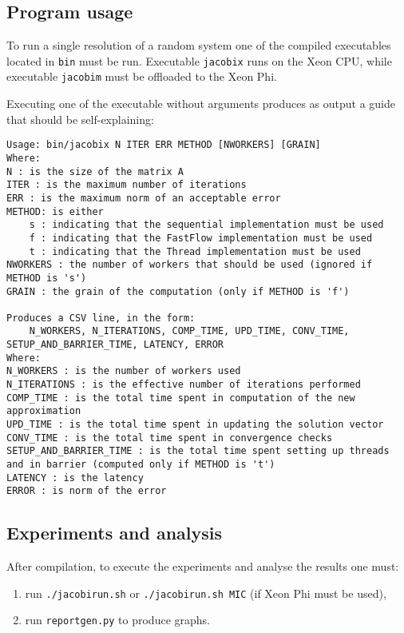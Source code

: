 \subsection{Program usage}
To run a single resolution of a random system one of the compiled executables located in \verb|bin| must be run.
Executable \verb|jacobix| runs on the Xeon CPU, while executable \verb|jacobim| must be offloaded to the Xeon Phi.

Executing one of the executable without arguments produces as output a guide that should be self-explaining:
\begin{lstlisting}
Usage: bin/jacobix N ITER ERR METHOD [NWORKERS] [GRAIN]
Where: 
N : is the size of the matrix A
ITER : is the maximum number of iterations
ERR : is the maximum norm of an acceptable error
METHOD: is either
	s : indicating that the sequential implementation must be used
	f : indicating that the FastFlow implementation must be used
	t : indicating that the Thread implementation must be used
NWORKERS : the number of workers that should be used (ignored if METHOD is 's')
GRAIN : the grain of the computation (only if METHOD is 'f')

Produces a CSV line, in the form:
	N_WORKERS, N_ITERATIONS, COMP_TIME, UPD_TIME, CONV_TIME, SETUP_AND_BARRIER_TIME, LATENCY, ERROR
Where:
N_WORKERS : is the number of workers used
N_ITERATIONS : is the effective number of iterations performed
COMP_TIME : is the total time spent in computation of the new approximation
UPD_TIME : is the total time spent in updating the solution vector
CONV_TIME : is the total time spent in convergence checks
SETUP_AND_BARRIER_TIME : is the total time spent setting up threads and in barrier (computed only if METHOD is 't')
LATENCY : is the latency
ERROR : is norm of the error
\end{lstlisting}

\subsection{Experiments and analysis}\label{subsec:runningexperiments}
After compilation, to execute the experiments and analyse the results one must:
\begin{enumerate}
	\item run \verb|./jacobirun.sh| or \verb|./jacobirun.sh MIC| (if Xeon Phi must be used), 
	\item run \verb|reportgen.py| to produce graphs.
\end{enumerate}